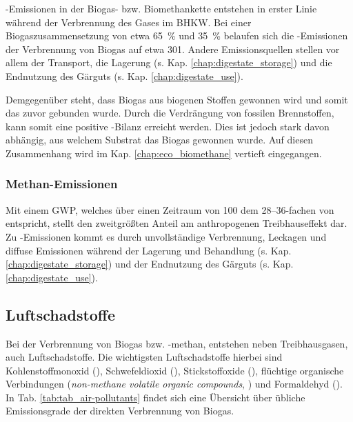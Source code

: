 -Emissionen in der Biogas- bzw. Biomethankette entstehen in erster Linie während der Verbrennung des Gases im \gls{BHKW}. Bei einer Biogaszusammensetzung von etwa \SI{65}{\percent}  und \SI{35}{\percent}  belaufen sich die -Emissionen der Verbrennung von Biogas auf etwa \SI[per-mode=symbol]{301}{\gcoeqkwh}. Andere Emissionsquellen stellen vor allem der Transport, die Lagerung (s. Kap. \ref{chap:digestate_storage}) und die Endnutzung des Gärguts (s. Kap. \ref{chap:digestate_use}). \parencite{Paolini2018} \parencite{Nielsen2014} \smallskip

Demgegenüber steht, dass Biogas aus biogenen Stoffen gewonnen wird und somit das  zuvor gebunden wurde. Durch die Verdrängung von fossilen Brennstoffen, kann somit eine positive -Bilanz erreicht werden. Dies ist jedoch stark davon abhängig, aus welchem Substrat das Biogas gewonnen wurde. Auf diesen Zusammenhang wird im Kap. \ref{chap:eco_biomethane} vertieft eingegangen.


\subsubsection{Methan-Emissionen}

Mit einem \gls{GWP}, welches über einen Zeitraum von \SI{100}{\Jahren} dem \SIrange{28}{36}{\relax}-fachen von  entspricht, stellt  den zweitgrößten Anteil am anthropogenen Treibhauseffekt dar. Zu -Emissionen kommt es durch unvollständige Verbrennung, Leckagen und diffuse Emissionen während der Lagerung und Behandlung (s. Kap. \ref{chap:digestate_storage}) und der Endnutzung des Gärguts (s. Kap. \ref{chap:digestate_use}). \parencite{Paolini2018}


\subsection{Luftschadstoffe}

Bei der Verbrennung von Biogas bzw. -methan, entstehen neben Treibhausgasen, auch Luftschadstoffe. Die wichtigsten Luftschadstoffe hierbei sind Kohlenstoffmonoxid (), Schwefeldioxid (), Stickstoffoxide (), flüchtige organische Verbindungen (\textit{non-methane volatile organic compounds}, ) und Formaldehyd (). In Tab. \ref{tab:tab_air-pollutants} findet sich eine Übersicht über übliche Emissionsgrade der direkten Verbrennung von Biogas.



